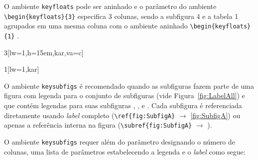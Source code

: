 {	O ambiente \verb|keyfloats| pode ser aninhado e o parâmetro  do ambiente \verb|\begin{keyfloats}{3}| especifica 3 colunas, sendo a subfigura 4 e a tabela 1 agrupados em uma mesma coluna com o ambiente aninhado  \verb|\begin{keyfloats}{1}| .
			
			\begin{keyfloats}{3}[lw=1,h=15em,kar,va=c]
				\begin{keyfloats}{1}[lw=1,kar]
				\end{keyfloats}
			\end{keyfloats}
			
			
			O ambiente \verb|keysubfigs| é recomendado quando  as subfiguras fazem parte de uma figura com legenda para o conjunto de subfiguras (vide Figura~\ref{fig:LabelAll}) e que contém legendas para suas subfiguras ,  ,   e  . Cada subfigura é referenciada diretamente usando \emph{label} completo (\verb|\ref{fig:SubfigA}| $\rightarrow$ \ref{fig:SubfigA}) ou apenas a referência interna na figura (\verb|| $\rightarrow$  \subref{fig:SubfigA}). 
			
			O ambiente \verb|keysubfigs| requer além do parâmetro designando o número de colunas, uma lista de parâmetros estabelecendo a legenda e o \emph{label} como segue:

}

